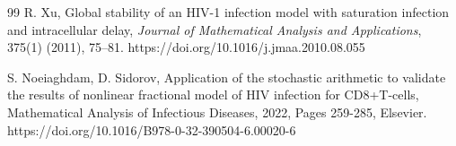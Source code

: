 \documentclass{article}
\theoremstyle{plain}
\theoremstyle{definition}
\numberwithin{equation}{section}
\begin{document}
\begin{thebibliography}{99}
R. Xu,
Global stability of an HIV-1 infection model with saturation infection and intracellular delay,
\textit{Journal of Mathematical Analysis and Applications}, 375(1) (2011), 75--81.
https://doi.org/10.1016/j.jmaa.2010.08.055


 S. Noeiaghdam, D. Sidorov, Application of the stochastic arithmetic to validate the results of nonlinear fractional model of HIV infection for CD8+T-cells, Mathematical Analysis of Infectious Diseases, 2022, Pages 259-285, Elsevier. https://doi.org/10.1016/B978-0-32-390504-6.00020-6

\end{thebibliography}
\end{document}
